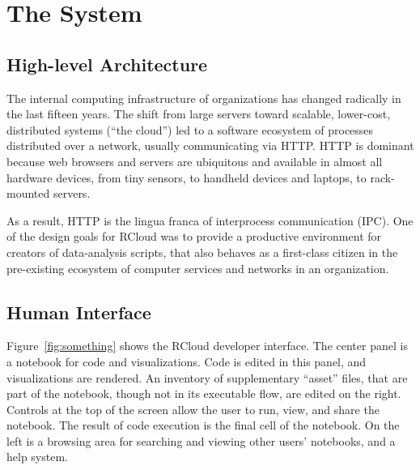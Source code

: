 \section{The System\label{sec:system}}

\subsection{High-level Architecture\label{sec:highlevelarchitecture}}


The internal computing infrastructure of organizations has changed
radically in the last fifteen years. The shift from large
servers toward scalable, lower-cost, distributed systems (``the cloud'')
led to a software ecosystem of processes distributed over a
network, usually communicating via HTTP. HTTP is dominant because
web browsers and servers are ubiquitous and available in almost
all hardware devices, from tiny sensors, to handheld devices and
laptops, to rack-mounted servers.

As a result, HTTP is the lingua franca of interprocess communication
(IPC). One of the design goals for RCloud was to provide a productive
environment for creators of data-analysis scripts, that also behaves
as a first-class citizen in the pre-existing ecosystem of computer
services and networks in an organization.


\subsection{Human Interface\label{sec:humaninterface}}


Figure~\ref{fig:something} shows the RCloud developer interface.  The center
panel is a notebook for code and visualizations.  Code is edited in this panel,
and visualizations are rendered.  An inventory of supplementary ``asset'' files,
that are part of the notebook, though not in its executable flow, are edited on
the right.  Controls at the top of the screen allow the user to run, view, and
share the notebook.  The result of code execution is the final cell of the notebook.  On the
left is a browsing area for searching and viewing other users' notebooks, and a
help system.

